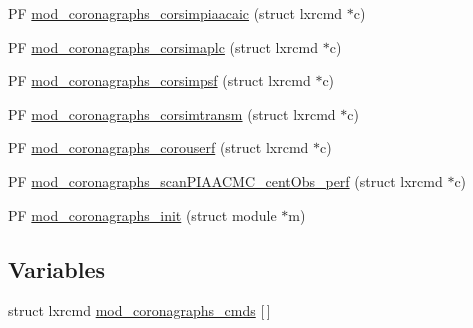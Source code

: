 \begin{DoxyCompactItemize}
\item 
P\+F \hyperlink{PIAACMCdesign_2src_2coronagraphs_2coronagraphs-util_8c_ae1bae2c1d62a3c1db1536f8d34cfc35f}{mod\+\_\+coronagraphs\+\_\+corsimpiaacaic} (struct lxrcmd $\ast$c)
\item 
P\+F \hyperlink{PIAACMCdesign_2src_2coronagraphs_2coronagraphs-util_8c_a1899341d9678aeef845c3e6b93a19665}{mod\+\_\+coronagraphs\+\_\+corsimaplc} (struct lxrcmd $\ast$c)
\item 
P\+F \hyperlink{PIAACMCdesign_2src_2coronagraphs_2coronagraphs-util_8c_a2c2a5519f28390c6681c02a74ac85c1c}{mod\+\_\+coronagraphs\+\_\+corsimpsf} (struct lxrcmd $\ast$c)
\item 
P\+F \hyperlink{PIAACMCdesign_2src_2coronagraphs_2coronagraphs-util_8c_a64f8790624a00f66c0909931f9b59fd1}{mod\+\_\+coronagraphs\+\_\+corsimtransm} (struct lxrcmd $\ast$c)
\item 
P\+F \hyperlink{PIAACMCdesign_2src_2coronagraphs_2coronagraphs-util_8c_abbb1d233077de55b9998a8ecf194f5ba}{mod\+\_\+coronagraphs\+\_\+corouserf} (struct lxrcmd $\ast$c)
\item 
P\+F \hyperlink{PIAACMCdesign_2src_2coronagraphs_2coronagraphs-util_8c_ad184c4a7b3e1b50678d6dac5953a2a1c}{mod\+\_\+coronagraphs\+\_\+scan\+P\+I\+A\+A\+C\+M\+C\+\_\+cent\+Obs\+\_\+perf} (struct lxrcmd $\ast$c)
\item 
P\+F \hyperlink{PIAACMCdesign_2src_2coronagraphs_2coronagraphs-util_8c_a72e1df16f2ec59428dbded2069869359}{mod\+\_\+coronagraphs\+\_\+init} (struct module $\ast$m)
\end{DoxyCompactItemize}
\subsection*{Variables}
\begin{DoxyCompactItemize}
\item 
struct lxrcmd \hyperlink{PIAACMCdesign_2src_2coronagraphs_2coronagraphs-util_8c_a1d7b5c14afe6db43c68aa98a53de63c0}{mod\+\_\+coronagraphs\+\_\+cmds} \mbox{[}$\,$\mbox{]}
\end{DoxyCompactItemize}


